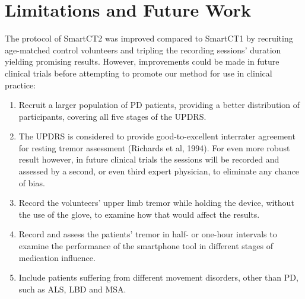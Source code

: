 \section{Limitations and Future Work}
\label{sec:SmartLimitations}
The protocol of \gls{SmartCT2} was improved compared to \gls{SmartCT1} by recruiting age-matched control volunteers and tripling the recording sessions' duration yielding promising results. However, improvements could be made in future clinical trials before attempting to promote our method for use in clinical practice:
\begin{enumerate}
\item Recruit a larger population of \gls{PD} patients, providing a better distribution of participants, covering all five stages of the \gls{UPDRS}.
\item The \gls{UPDRS} is considered to provide good-to-excellent interrater agreement for resting tremor assessment (Richards et al, 1994). For even more robust result however, in future clinical trials the sessions will be recorded and assessed by a second, or even third expert physician, to eliminate any chance of bias.
\item Record the volunteers' upper limb tremor while holding the device, without the use of the glove, to examine how that would affect the results. 
\item Record and assess the patients' tremor in half- or one-hour intervals to examine the performance of the smartphone tool in different stages of medication influence. 
\item Include patients suffering from different movement disorders, other than \gls{PD}, such as \gls{ALS}, \gls{LBD} and \gls{MSA}. 
\end{enumerate}

